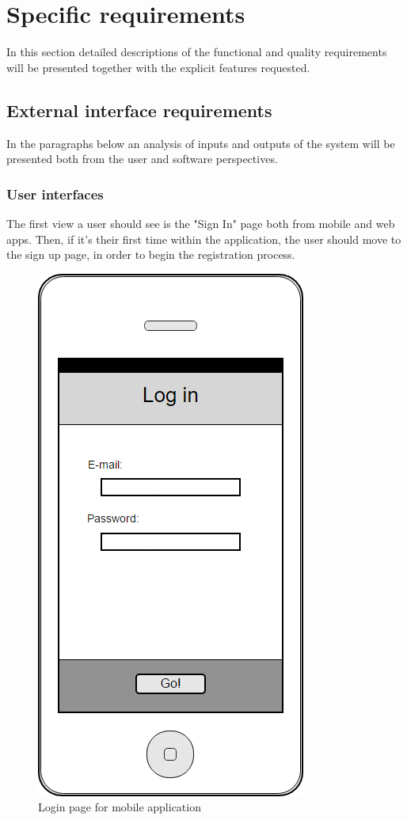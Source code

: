 \documentclass{article}
\begin{document}
\section{Specific requirements}
In this section detailed descriptions of the functional and quality requirements will be presented together with the explicit features requested.
\subsection{External interface requirements}
In the paragraphs below an analysis of inputs and outputs of the system will be presented both from the user and software perspectives.
\subsubsection{User interfaces}
The first view a user should see is the "Sign In" page both from mobile and web apps.
Then, if it's their first time within the application, the user should move to the sign up page, in order to begin the registration process.
\newpage

\begin{figure}
    \centering
    \includegraphics[width=0.35\columnwidth]{Login1/Login1}
    \caption{Login page for mobile application}
    \label{fig:mobile-login}
\end{figure}
\end{document}
